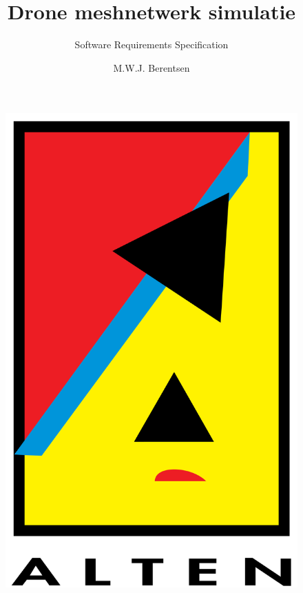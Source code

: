 \documentclass[a4paper, 11pt, oneside]{report}
\author{M.W.J. Berentsen}
\title{\myfont Drone meshnetwerk simulatie}
\subtitle{Software Requirements Specification}{HAN Arnhem}{561399}{MWJ.Berentsen@student.han.nl}{Versie 1}{Alten Nederland B.V.}{Docent: J. Visch, MSc}{Assessor: ir. C.G.R. van Uffelen}
\begin{document}
\begin{figure}
\begin{center}\includegraphics[scale=0.1]{alten}\end{center}
\end{figure}
\maketitle

\end{document}
